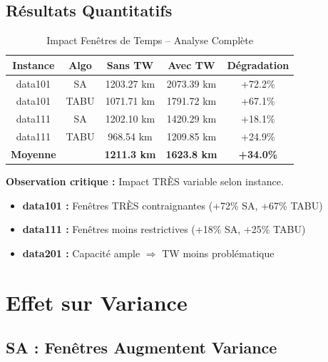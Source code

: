 \documentclass[12pt,a4paper,twoside]{report}
\begin{document}
\subsection{Résultats Quantitatifs}

\begin{table}[H]
    \centering
    \caption{Impact Fenêtres de Temps -- Analyse Complète}
    \begin{tabular}{|c|c|c|c|c|}
        \hline
        \textbf{Instance} & \textbf{Algo} & \textbf{Sans TW}   & \textbf{Avec TW}   & \textbf{Dégradation} \\
        \hline
        data101           & SA            & 1203.27 km         & 2073.39 km         & +72.2\%              \\
        data101           & TABU          & 1071.71 km         & 1791.72 km         & +67.1\%              \\
        data111           & SA            & 1202.10 km         & 1420.29 km         & +18.1\%              \\
        data111           & TABU          & 968.54 km          & 1209.85 km         & +24.9\%              \\
        \hline
        \textbf{Moyenne}  & \textbf{}     & \textbf{1211.3 km} & \textbf{1623.8 km} & \textbf{+34.0\%}     \\
        \hline
    \end{tabular}
\end{table}

\textbf{Observation critique :} Impact TRÈS variable selon instance.

\begin{itemize}
    \item \textbf{data101 :} Fenêtres TRÈS contraignantes (+72\% SA, +67\% TABU)
    \item \textbf{data111 :} Fenêtres moins restrictives (+18\% SA, +25\% TABU)
    \item \textbf{data201 :} Capacité ample $\Rightarrow$ TW moins problématique
\end{itemize}

\section{Effet sur Variance}

\subsection{SA : Fenêtres Augmentent Variance}
\end{document}
